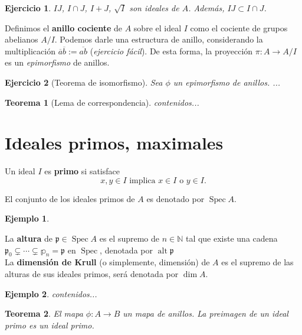 \documentclass[12pt]{book}
\newtheorem{eje}{Ejemplo}
\newtheorem{teo}{Teorema}
\newtheorem{ex}{Ejercicio}
\begin{document}
\begin{ex}
$IJ$, $I\cap J$, $I+J$, $\sqrt{I}$ son ideales de $A$. Además, $IJ \subset I\cap J$. 
\end{ex} 



Definimos el \textbf{anillo cociente} de $A$ sobre el ideal $I$ como el cociente de grupos abelianos $A/I$. Podemos darle una estructura de anillo, considerando la multiplicación $ \overline{a} \overline{b} := \overline{ab}$ (\textit{ejercicio fácil}). De esta forma, la proyección $\pi:A\rightarrow A/I$ es un \textit{epimorfismo} de anillos.\\

\begin{ex}[Teorema de isomorfismo]
Sea $\phi$ un epimorfismo de anillos. ...
\end{ex}

\begin{teo}[Lema de correspondencia]
	contenidos...
\end{teo}

\section{Ideales primos, maximales}

Un ideal $I$ es \textbf{primo} si satisface $$ x,y \in I \mbox{ implica } x \in I \mbox{ o } y\in I .$$

El conjunto de los ideales primos de $A$ es denotado por $\operatorname{Spec}A$.



\begin{eje}

\end{eje} 
La \textbf{altura} de $\mathfrak{p}\in \operatorname{Spec}A$ es el supremo de $n\in \mathbb{N}$ tal que existe una cadena $ \mathfrak{p}_0 \subsetneq \cdots \subsetneq \mathbb{p}_n = \mathfrak{p}$ en $\operatorname{Spec}$, denotada por $\operatorname{alt} \mathfrak{p}$\\
La \textbf{dimensión de Krull} (o simplemente, dimensión) de $A$ es el supremo de las alturas de sus ideales primos, será denotada por $\dim A$.

\begin{eje}
	contenidos...
\end{eje}

\begin{teo}
	El mapa $\phi:A\rightarrow B$ un mapa de anillos. La preimagen de un ideal  primo es un ideal primo.
\end{teo}
\end{document}
